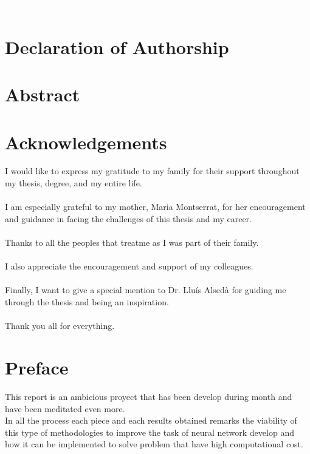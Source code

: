 \documentclass[a4paper, 11pt]{article}
\begin{document}
\justifying
\newpage
\textcolor{white}{a}
\newpage 

\section*{Declaration of Authorship}
\newpage
\section*{Abstract}
\newpage
\section*{Acknowledgements}
I would like to express my gratitude to my family for their support throughout my thesis, degree, and my entire life.\\
\textcolor{white}{a}\\
I am especially grateful to my mother, Maria Montserrat, for her encouragement and guidance in facing the challenges of this thesis and my career.\\
\textcolor{white}{a}\\
Thanks to all the peoples that treatme as I was part of their family.\\
\textcolor{white}{a}\\
I also appreciate the encouragement and support of my colleagues.\\
\textcolor{white}{a}\\
Finally, I want to give a special mention to Dr. Lluís Alsedà for guiding me through the thesis and being an inspiration.\\
\textcolor{white}{a}\\
Thank you all for everything. 
\newpage

\tableofcontents
\listoffigures
\listoftables

\newpage
\section*{Preface}
This report is an ambicious proyect that has been develop during month and have been meditated even more.\\
In all the process each piece and each results obtained remarks the viability of this type of methodologies to improve the task of neural network develop and how it can be implemented to solve problem that have high computational cost.

\newpage \pagestyle{extended_plain}
\setcounter{page}{2}
\end{document}
